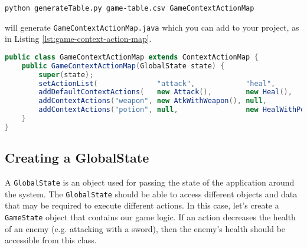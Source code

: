 \documentclass{article}
\begin{document}
\begin{center}
\texttt{python generateTable.py game-table.csv GameContextActionMap}
\end{center}

will generate \texttt{GameContextActionMap.java} which you can add to your project, as in Listing \ref{lst:game-context-action-map}.


\begin{lstlisting}[language=Java, caption=Example of a ContextActionMap, label={lst:game-context-action-map}]
public class GameContextActionMap extends ContextActionMap {
    public GameContextActionMap(GlobalState state) {
        super(state);
        setActionList(              "attack",            "heal",               "move");
        addDefaultContextActions(   new Attack(),        new Heal(),           new Move());
        addContextActions("weapon", new AtkWithWeapon(), null,                 null);
        addContextActions("potion", null,                new HealWithPotion(), null);
    }
}
\end{lstlisting}

\subsection{Creating a GlobalState}

A \texttt{GlobalState} is an object used for passing the state of the application around the system. The \texttt{GlobalState} should be able to access different objects and data that may be required to execute different actions. In this case, let's create a \texttt{GameState} object that contains our game logic. If an action decreases the health of an enemy (e.g. attacking with a sword), then the enemy's health should be accessible from this class.

\end{document}
